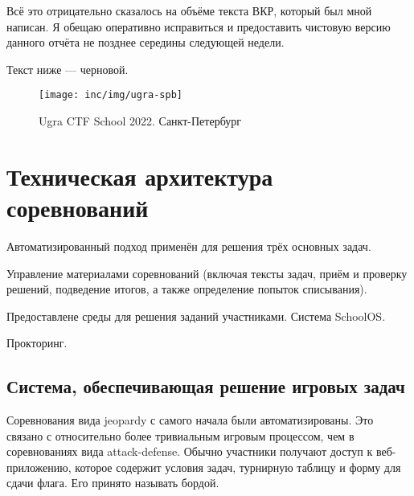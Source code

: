Всё это отрицательно сказалось на объёме текста ВКР, который был мной написан. Я обещаю оперативно исправиться и предоставить чистовую версию данного отчёта не позднее середины следующей недели.

Текст ниже --- черновой.

\begin{figure}
  \centering
  \texttt{[image: inc/img/ugra-spb]}
  \caption{Ugra CTF School 2022. Санкт-Петербург}
\end{figure}

\section{Техническая архитектура соревнований}

Автоматизированный подход применён для решения трёх основных задач.

Управление материалами соревнований (включая тексты задач, приём и проверку решений, подведение итогов, а также определение попыток списывания).

Предоставлене среды для решения заданий участниками. Система SchoolOS.

Прокторинг.







\subsection{Система, обеспечивающая решение игровых задач}

Соревнования вида jeopardy с самого начала были автоматизированы. Это связано с относительно более тривиальным игровым процессом, чем в соревнованиях вида attack-defense. Обычно участники получают доступ к веб-приложению, которое содержит условия задач, турнирную таблицу и форму для сдачи флага. Его принято называть бордой.

